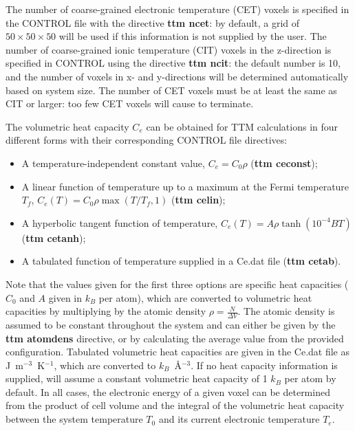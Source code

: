 The number of coarse-grained electronic temperature (CET) voxels is 
specified in the CONTROL file with the directive {\bf ttm ncet}: by default, 
a grid of $50 \times 50 \times 50$ will be used if this information is not 
supplied by the user. The number of coarse-grained ionic temperature (CIT) 
voxels in the z-direction is specified in CONTROL using the directive 
{\bf ttm ncit}: the default number is 10, and the number of voxels in x- 
and y-directions will be determined automatically based on system size. 
The number of CET voxels must be at least the same as CIT or larger: 
too few CET voxels will cause \D to terminate.

The volumetric heat capacity $C_e$ can be obtained for TTM calculations 
in four different forms with their corresponding CONTROL file directives: 
\begin{itemize}
\item A temperature-independent constant value, $C_e = C_0 \rho$ ({\bf ttm ceconst});
\item A linear function of temperature up to a maximum at the Fermi temperature $T_{f}$, $C_e (T) = C_0 \rho \max \left(T/T_{f}, 1\right)$ ({\bf ttm celin});
\item A hyperbolic tangent function of temperature, $C_e (T) = A \rho \tanh \left(10^{-4} B T\right)$ ({\bf ttm cetanh});
\item A tabulated function of temperature supplied in a Ce.dat file  ({\bf ttm cetab}).
\end{itemize}
Note that the values given for the first three options are specific heat 
capacities ($C_0$ and $A$ given in $k_B$ per atom), which are 
converted to volumetric heat capacities by multiplying by the atomic 
density $\rho = \frac{N}{\Delta V}$. The atomic density is assumed to 
be constant throughout the system and can either be given by the 
{\bf ttm atomdens} directive, or by calculating the average value from 
the provided configuration. Tabulated volumetric heat capacities are given 
in the Ce.dat file as J~m$^{-3}$~K$^{-1}$, which are converted to 
$k_B$~\AA$^{-3}$. If no heat capacity information is supplied, \D will 
assume a constant volumetric heat capacity of 1 $k_B$ per atom by 
default. In all cases, the electronic energy of a given voxel can be 
determined from the product of cell volume and the integral of the 
volumetric heat capacity between the system temperature $T_0$ 
and its current electronic temperature $T_e$.

